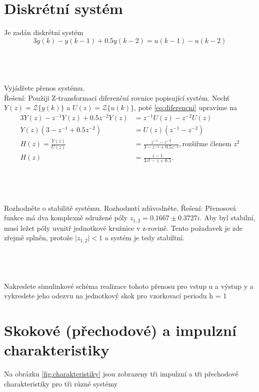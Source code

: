 \documentclass[twoside]{article}
\begin{document}
\section{Diskrétní systém}
\label{sec:ukol10}
Je zadán diskrétní systém
\begin{equation}
	\label{eq:diferencni}
	3y(k) - y(k-1) + 0.5 y(k-2) = u(k-1)-u(k-2)
\end{equation}

\subsection{~}
Vyjádřete přenos systému. \\
Řešení: Použiji Z-transformaci diferenční rovnice popisující systém. Nechť $Y(z) = \mathcal{Z}\{y(k)\}$ a $U(z) = \mathcal{Z}\{u(k)\}$, poté \eqref{eq:diferencni} upravíme na
\begin{equation}
	\begin{split}
		3Y(z) - z^{-1} Y(z) + 0.5 z^{-2} Y(z) &= z^{-1}U(z) - z^{-2}U(z) \\
		Y(z) (3- z^{-1} + 0.5 z^{-2}) &= U(z) (z^{-1} - z^{-2}) \\
		H(z) = \frac{Y(z)}{U(z)} &= \frac{z^{-1} - z^{-2}}{3-z^{-1}+ 0.5z^{-2}}, \text{rozšiřme členem $z^2$} \\
		H(z) &= \frac{z - 1}{3z^2-z+ 0.5}.
	\end{split}
\end{equation}

\subsection{~}
Rozhodněte o stabilitě systému. Rozhodnutí zdůvodněte.
Řešení: Přenosová funkce má dva komplexně sdružené póly $ z_{1,2} = 0.1667 \pm 0.3727i$. Aby byl stabilní, musí ležet póly uvnitř jednotkové kružnice v z-rovině.
Tento požadavek je zde zřejmě splněn, protože $\vert z_{1,2} \vert < 1 $ a systém je tedy stabiltní.
\subsection{~}
Nakreslete simulinkové schéma realizace tohoto přenosu pro vstup u a výstup y a vykreslete jeho odezvu
na jednotkový skok pro vzorkovací periodu h = 1


\section{ Skokové (přechodové) a impulzní charakteristiky}
\label{sec:ukol11}
Na obrázku \ref{fig:charakteristiky} jsou zobrazeny tři impulzní a tři přechodové charakteristiky pro tři různé systémy
\end{document}
